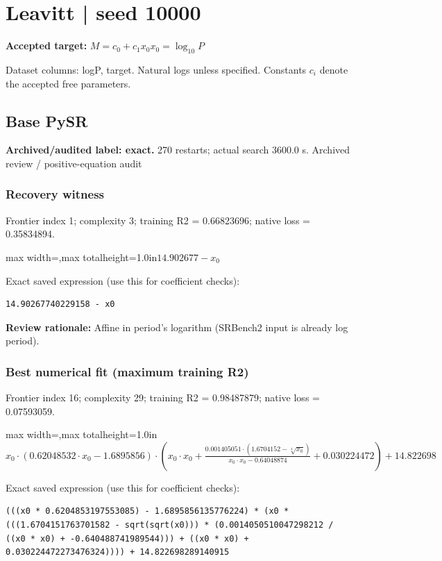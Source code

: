\documentclass[10pt,letterpaper,landscape]{article}
\begin{document}
\section*{Leavitt | seed 10000}
\textbf{Accepted target:} $\displaystyle M=c_0+c_1x_0$\hfill $x_0=\log_{10}P$\par
{\small Dataset columns: logP, target. Natural logs unless specified. Constants $c_i$ denote the accepted free parameters.}\par\medskip
\begin{minipage}[t]{0.485\textwidth}
\subsection*{Base PySR}
\textbf{Archived/audited label: exact.} 270 restarts; actual search 3600.0 s.
{\small Archived review / positive-equation audit}
\subsubsection*{Recovery witness}
Frontier index 1; complexity 3; training R2 = 0.66823696; native loss = 0.35834894.
\begin{center}\begin{adjustbox}{max width=\linewidth,max totalheight=1.0in}$\displaystyle 14.902677 - x_{0}$\end{adjustbox}\end{center}
{\scriptsize Exact saved expression (use this for coefficient checks):}
\begin{lstlisting}
14.90267740229158 - x0
\end{lstlisting}
{\small\textbf{Review rationale:} Affine in period's logarithm (SRBench2 input is already log period).}
\subsubsection*{Best numerical fit (maximum training R2)}
Frontier index 16; complexity 29; training R2 = 0.98487879; native loss = 0.07593059.
\begin{center}\begin{adjustbox}{max width=\linewidth,max totalheight=1.0in}$\displaystyle x_{0} \cdot \left(0.62048532 \cdot x_{0} - 1.6895856\right) \cdot \left(x_{0} \cdot x_{0} + \frac{0.001405051 \cdot \left(1.6704152 - \sqrt[4]{x_{0}}\right)}{x_{0} \cdot x_{0} - 0.64048874} + 0.030224472\right) + 14.822698$\end{adjustbox}\end{center}
{\scriptsize Exact saved expression (use this for coefficient checks):}
\begin{lstlisting}
(((x0 * 0.6204853197553085) - 1.6895856135776224) * (x0 * (((1.6704151763701582 - sqrt(sqrt(x0))) * (0.0014050510047298212 / ((x0 * x0) + -0.640488741989544))) + ((x0 * x0) + 0.030224472273476324)))) + 14.822698289140915
\end{lstlisting}
\end{minipage}\hfill
\end{document}

